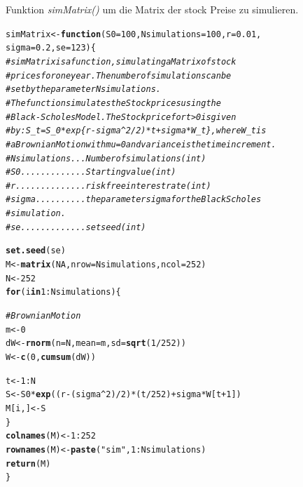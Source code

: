 \documentclass[10pt,a4paper]{article}\usepackage[]{graphicx}\usepackage[]{color}
\makeatletter
\newcommand{\hlnum}[1]{\textcolor[rgb]{0.686,0.059,0.569}{#1}}%
\newcommand{\hlstr}[1]{\textcolor[rgb]{0.192,0.494,0.8}{#1}}%
\newcommand{\hlcom}[1]{\textcolor[rgb]{0.678,0.584,0.686}{\textit{#1}}}%
\newcommand{\hlopt}[1]{\textcolor[rgb]{0,0,0}{#1}}%
\newcommand{\hlstd}[1]{\textcolor[rgb]{0.345,0.345,0.345}{#1}}%
\newcommand{\hlkwa}[1]{\textcolor[rgb]{0.161,0.373,0.58}{\textbf{#1}}}%
\newcommand{\hlkwb}[1]{\textcolor[rgb]{0.69,0.353,0.396}{#1}}%
\newcommand{\hlkwc}[1]{\textcolor[rgb]{0.333,0.667,0.333}{#1}}%
\newcommand{\hlkwd}[1]{\textcolor[rgb]{0.737,0.353,0.396}{\textbf{#1}}}%
\newenvironment{kframe}{%
 \def\at@end@of@kframe{}%
 \ifinner\ifhmode%
  \def\at@end@of@kframe{\end{minipage}}%
  \begin{minipage}{\columnwidth}%
 \fi\fi%
 \def\FrameCommand##1{\hskip\@totalleftmargin \hskip-\fboxsep
 \colorbox{shadecolor}{##1}\hskip-\fboxsep
     \hskip-\linewidth \hskip-\@totalleftmargin \hskip\columnwidth}%
 \MakeFramed {\advance\hsize-\width
   \@totalleftmargin\z@ \linewidth\hsize
   \@setminipage}}%
 {\par\unskip\endMakeFramed%
 \at@end@of@kframe}
\makeatother
\begin{document}
Funktion \textit{simMatrix()} um die Matrix der stock Preise zu simulieren.

\begin{kframe}
\begin{alltt}
\hlstd{simMatrix} \hlkwb{<-} \hlkwa{function}\hlstd{(}\hlkwc{S0}\hlstd{=}\hlnum{100}\hlstd{,} \hlkwc{Nsimulations}\hlstd{=}\hlnum{100}\hlstd{,} \hlkwc{r}\hlstd{=}\hlnum{0.01}\hlstd{,}
                      \hlkwc{sigma}\hlstd{=}\hlnum{0.2}\hlstd{,} \hlkwc{se}\hlstd{=}\hlnum{123}\hlstd{)\{}
  \hlcom{# simMatrix is a function, simulating a Matrix of stock}
  \hlcom{# prices for one year. The number of simulations can be}
  \hlcom{# set by the parameter Nsimulations. }
  \hlcom{# The function simulates the Stock prices using the }
  \hlcom{# Black-Scholes Model. The Stock price for t>0 is given}
  \hlcom{# by: S_t = S_0 * exp\{r-sigma^2/2)*t + sigma*W_t\}, where W_t is }
  \hlcom{# a Brownian Motion with mu=0 and variance is the time increment.}
  \hlcom{# Nsimulations ... Number of simulations (int)}
  \hlcom{# S0 ............. Starting value (int)}
  \hlcom{# r .............. risk free interest rate (int)}
  \hlcom{# sigma .......... the parameter sigma for the Black Scholes}
  \hlcom{#                  simulation. }
  \hlcom{# se ............. set seed (int)}

  \hlkwd{set.seed}\hlstd{(se)}
  \hlstd{M} \hlkwb{<-} \hlkwd{matrix}\hlstd{(}\hlnum{NA}\hlstd{,} \hlkwc{nrow}\hlstd{=Nsimulations,} \hlkwc{ncol}\hlstd{=}\hlnum{252}\hlstd{)}
  \hlstd{N} \hlkwb{<-} \hlnum{252}
  \hlkwa{for} \hlstd{(i} \hlkwa{in} \hlnum{1}\hlopt{:}\hlstd{Nsimulations)\{}

    \hlcom{# Brownian Motion}
    \hlstd{m} \hlkwb{<-} \hlnum{0}
    \hlstd{dW} \hlkwb{<-} \hlkwd{rnorm}\hlstd{(}\hlkwc{n}\hlstd{=N,} \hlkwc{mean}\hlstd{=m,} \hlkwc{sd}\hlstd{=}\hlkwd{sqrt}\hlstd{(}\hlnum{1}\hlopt{/}\hlnum{252}\hlstd{))}
    \hlstd{W} \hlkwb{<-} \hlkwd{c}\hlstd{(}\hlnum{0}\hlstd{,} \hlkwd{cumsum}\hlstd{(dW))}

    \hlstd{t} \hlkwb{<-} \hlnum{1}\hlopt{:}\hlstd{N}
    \hlstd{S} \hlkwb{<-} \hlstd{S0}\hlopt{*}\hlkwd{exp}\hlstd{((r}\hlopt{-}\hlstd{(sigma}\hlopt{^}\hlnum{2}\hlstd{)}\hlopt{/}\hlnum{2}\hlstd{)}\hlopt{*}\hlstd{(t}\hlopt{/}\hlnum{252}\hlstd{)}\hlopt{+}\hlstd{sigma}\hlopt{*}\hlstd{W[t}\hlopt{+}\hlnum{1}\hlstd{])}
    \hlstd{M[i,]} \hlkwb{<-} \hlstd{S}
  \hlstd{\}}
  \hlkwd{colnames}\hlstd{(M)} \hlkwb{<-} \hlnum{1}\hlopt{:}\hlnum{252}
  \hlkwd{rownames}\hlstd{(M)} \hlkwb{<-} \hlkwd{paste}\hlstd{(}\hlstr{"sim"}\hlstd{,} \hlnum{1}\hlopt{:}\hlstd{Nsimulations)}
  \hlkwd{return}\hlstd{(M)}
\hlstd{\}}
\end{alltt}
\end{kframe}
\end{document}
